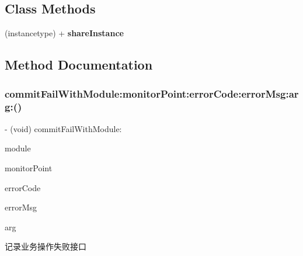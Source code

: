 \subsection*{Class Methods}
\begin{DoxyCompactItemize}
\item 
\mbox{\label{interface_alibc_monitor_util_a70ee2dc1d3c2b320b33bc19c99c6ab87}} 
(instancetype) + {\bfseries share\+Instance}
\end{DoxyCompactItemize}


\subsection{Method Documentation}
\mbox{\label{interface_alibc_monitor_util_a1ca43b26e44abc9aee37454a3c03f853}} 
\subsubsection{\texorpdfstring{commit\+Fail\+With\+Module\+:monitor\+Point\+:error\+Code\+:error\+Msg\+:arg\+:()}{commitFailWithModule:monitorPoint:errorCode:errorMsg:arg:()}}
{\footnotesize\ttfamily -\/ (void) commit\+Fail\+With\+Module\+: \begin{DoxyParamCaption}\item[{(N\+S\+String $\ast$)}]{module }\item[{monitorPoint:(N\+S\+String $\ast$)}]{monitor\+Point }\item[{errorCode:(N\+S\+String $\ast$)}]{error\+Code }\item[{errorMsg:(N\+S\+String $\ast$)}]{error\+Msg }\item[{arg:(N\+S\+String $\ast$)}]{arg }\end{DoxyParamCaption}}

记录业务操作失败接口


